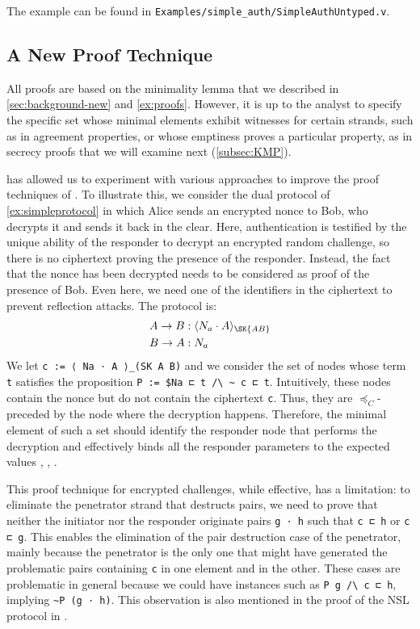 The example can be found in \lstinline{Examples/simple_auth/SimpleAuthUntyped.v}.

\subsection{A New Proof Technique}\label{sec:newproofs}
All proofs are based on the minimality lemma that we described in \cref{sec:background-new} and \cref{ex:proofs}.
However, it is up to the analyst to specify the specific set whose minimal elements exhibit witnesses for certain strands, such as in agreement properties, or whose emptiness proves a particular property, as in secrecy proofs that we will examine next (\cref{subsec:KMP}).

\easystrands{} has allowed us to experiment with various approaches to improve the proof techniques of \cite{FHG98}.
To illustrate this, we consider the dual protocol of \cref{ex:simpleprotocol} in which Alice sends an encrypted nonce to Bob, who decrypts it and sends it back in the clear.
Here, authentication is testified by the unique ability of the responder to decrypt an encrypted random challenge, so there is no ciphertext proving the presence of the responder.
Instead, the fact that the nonce has been decrypted needs to be considered as proof of the presence of Bob. Even here, we need one of the identifiers in the ciphertext to prevent reflection attacks.
The protocol is:
\begin{align*}
  A \rightarrow B & : \enc{N_a \cdot A}{\SK{AB}} \\
  B \rightarrow A & : N_a
\end{align*}
We let \lstinline|c := ⟨ Na ⋅ A ⟩_(SK A B)| and we consider the set of nodes whose term \lstinline|t| satisfies the proposition \lstinline|P := $Na ⊏ t /\ ~ c ⊏ t|.
Intuitively, these nodes contain the nonce \Na but do not contain the ciphertext \lstinline|c|.
Thus, they are $\preceq_C$-preceded by the node where the decryption happens.
Therefore, the minimal element of such a set should identify the responder node that performs the decryption and effectively binds all the responder parameters to the expected values \A, \B, \Na.

This proof technique for encrypted challenges, while effective, has a limitation: to eliminate the penetrator strand that destructs pairs, we need to prove that neither the initiator nor the responder originate pairs \lstinline|g ⋅ h| such that \linebreak\lstinline{c ⊏ h} or \lstinline|c ⊏ g|.
This enables the elimination of the pair destruction case of the penetrator, mainly because the penetrator is the only one that might have generated the problematic pairs containing \lstinline|c| in one element and \Na in the other.
These cases are problematic in general because we could have instances such as \linebreak\lstinline|P g /\ c ⊏ h|, implying \lstinline|~P (g ⋅ h)|. This observation is also mentioned in the proof of the NSL protocol in \cite{FHG98}.

